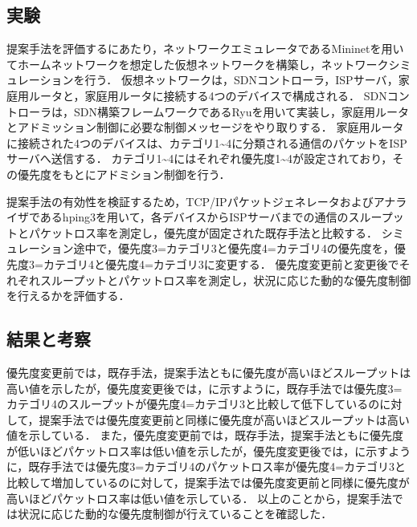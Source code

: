 \documentclass[a4paper,10pt,twocolumn,uplatex]{jsarticle}
\begin{document}
\subsection{実験}
提案手法を評価するにあたり，ネットワークエミュレータであるMininetを用いてホームネットワークを想定した仮想ネットワークを構築し，ネットワークシミュレーションを行う．
仮想ネットワークは，SDNコントローラ，ISPサーバ，家庭用ルータと，家庭用ルータに接続する4つのデバイスで構成される．
SDNコントローラは，SDN構築フレームワークであるRyuを用いて実装し，家庭用ルータとアドミッション制御に必要な制御メッセージをやり取りする．
家庭用ルータに接続された4つのデバイスは、カテゴリ1\textasciitilde4に分類される通信のパケットをISPサーバへ送信する．
カテゴリ1\textasciitilde4にはそれぞれ優先度1\textasciitilde4が設定されており，その優先度をもとにアドミション制御を行う．\par
提案手法の有効性を検証するため，TCP/IPパケットジェネレータおよびアナライザであるhping3を用いて，各デバイスからISPサーバまでの通信のスループットとパケットロス率を測定し，優先度が固定された既存手法と比較する．
シミュレーション途中で，優先度3=カテゴリ3と優先度4=カテゴリ4の優先度を，優先度3=カテゴリ4と優先度4=カテゴリ3に変更する．
優先度変更前と変更後でそれぞれスループットとパケットロス率を測定し，状況に応じた動的な優先度制御を行えるかを評価する．

\subsection{結果と考察}
優先度変更前では，既存手法，提案手法ともに優先度が高いほどスループットは高い値を示したが，優先度変更後では，に示すように，既存手法では優先度3=カテゴリ4のスループットが優先度4=カテゴリ3と比較して低下しているのに対して，提案手法では優先度変更前と同様に優先度が高いほどスループットは高い値を示している．
また，優先度変更前では，既存手法，提案手法ともに優先度が低いほどパケットロス率は低い値を示したが，優先度変更後では，に示すように，既存手法では優先度3=カテゴリ4のパケットロス率が優先度4=カテゴリ3と比較して増加しているのに対して，提案手法では優先度変更前と同様に優先度が高いほどパケットロス率は低い値を示している．
以上のことから，提案手法では状況に応じた動的な優先度制御が行えていることを確認した．
\end{document}
